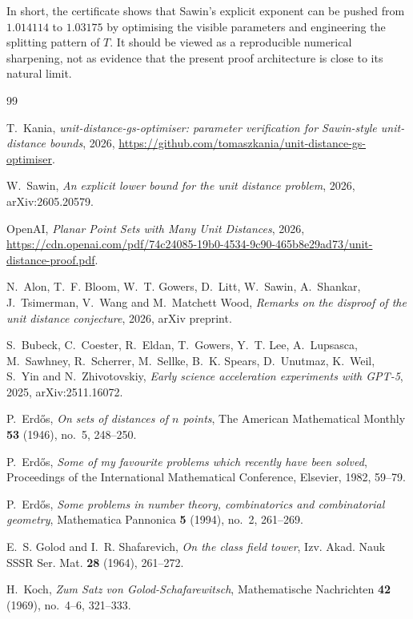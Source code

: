 \documentclass[11pt]{amsart}
\begin{document}
In short, the certificate shows that Sawin's explicit exponent can be pushed from $1.014114$ to $1.03175$ by optimising the visible parameters and engineering the splitting pattern of $T$.  It should be viewed as a reproducible numerical sharpening, not as evidence that the present proof architecture is close to its natural limit.

\begin{thebibliography}{99}

T.~Kania,
\emph{unit-distance-gs-optimiser: parameter verification for Sawin-style unit-distance bounds},
2026,
\url{https://github.com/tomaszkania/unit-distance-gs-optimiser}.

W.~Sawin,
\emph{An explicit lower bound for the unit distance problem},
2026,
arXiv:2605.20579.

OpenAI,
\emph{Planar Point Sets with Many Unit Distances},
2026,
\url{https://cdn.openai.com/pdf/74c24085-19b0-4534-9c90-465b8e29ad73/unit-distance-proof.pdf}.

N.~Alon, T.~F. Bloom, W.~T. Gowers, D.~Litt, W.~Sawin, A.~Shankar, J.~Tsimerman, V.~Wang and M.~Matchett Wood,
\emph{Remarks on the disproof of the unit distance conjecture},
2026, arXiv preprint.

S.~Bubeck, C.~Coester, R.~Eldan, T.~Gowers, Y.~T. Lee, A.~Lupsasca, M.~Sawhney, R.~Scherrer, M.~Sellke, B.~K. Spears, D.~Unutmaz, K.~Weil, S.~Yin and N.~Zhivotovskiy,
\emph{Early science acceleration experiments with GPT-5},
2025, arXiv:2511.16072.

P.~Erd\H{o}s,
\emph{On sets of distances of {$n$} points},
The American Mathematical Monthly \textbf{53} (1946), no.~5, 248--250.

P.~Erd\H{o}s,
\emph{Some of my favourite problems which recently have been solved},
Proceedings of the International Mathematical Conference, Elsevier, 1982, 59--79.

P.~Erd\H{o}s,
\emph{Some problems in number theory, combinatorics and combinatorial geometry},
Mathematica Pannonica \textbf{5} (1994), no.~2, 261--269.

E.~S. Golod and I.~R. Shafarevich,
\emph{On the class field tower},
Izv. Akad. Nauk SSSR Ser. Mat. \textbf{28} (1964), 261--272.

H.~Koch,
\emph{Zum Satz von Golod-Schafarewitsch},
Mathematische Nachrichten \textbf{42} (1969), no.~4--6, 321--333.


\end{thebibliography}
\end{document}
